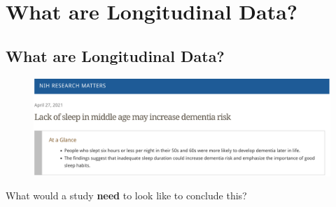 \chapter{What are Longitudinal Data?}
\section{What are Longitudinal Data?}
\begin{figure}[H]
    \centering
    \includegraphics[width=\textwidth]{figures/002-study.pdf}
\end{figure}
What would a study \textbf{need} to look like to conclude this?
